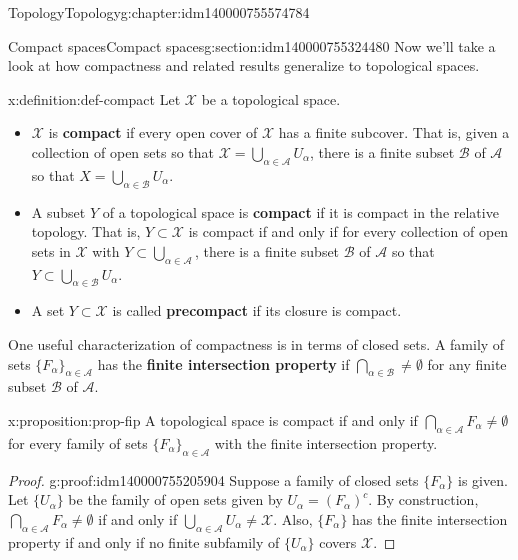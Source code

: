 \documentclass[oneside,10pt,]{book}
\newcommand{\terminology}[1]{\textbf{#1}}
\numberwithin{equation}{section}
\newcommand{\A}{\mathcal{A}}
\newcommand{\X}{\mathcal{X}}
\numberwithin{equation}{section}
\begin{document}
\begin{chapterptx}{Topology}{}{Topology}{}{}{g:chapter:idm140000755574784}
%
%
\typeout{************************************************}
\typeout{************************************************}
%
\begin{sectionptx}{Compact spaces}{}{Compact spaces}{}{}{g:section:idm140000755324480}
Now we'll take a look at how compactness and related results generalize to topological spaces.%
\begin{definition}{}{x:definition:def-compact}%
Let \(\X\) be a topological space.%
\begin{itemize}[label=\textbullet]
\item{}\(\X\) is \terminology{compact} if every open cover of \(\X\) has a finite subcover. That is, given a collection of open sets so that \(\X = \bigcup_{\alpha \in \mathcal A} U_\alpha\), there is a finite subset \(\mathcal B\) of \(\mathcal A\) so that \(X = \bigcup_{\alpha \in \mathcal B} U_\alpha\).%
\item{}A subset \(Y\) of a topological space is \terminology{compact} if it is compact in the relative topology. That is, \(Y \subset \X\) is compact if and only if for every collection of open sets in \(\X\) with \(Y \subset \bigcup_{\alpha \in \mathcal A}\), there is a finite subset \(\mathcal B\) of \(\mathcal A\) so that \(Y \subset \bigcup_{\alpha \in \mathcal B} U_\alpha\).%
\item{}A set \(Y \subset \X\) is called \terminology{precompact} if its closure is compact.%
\end{itemize}
%
\end{definition}
One useful characterization of compactness is in terms of closed sets. A family of sets \(\{F_\alpha\}_{\alpha \in \mathcal A}\) has the \terminology{finite intersection property} if \(\bigcap_{\alpha \in \mathcal B} \neq \emptyset\) for any finite subset \(\mathcal B\) of \(\mathcal A\).%
\begin{proposition}{}{}{x:proposition:prop-fip}%
A topological space is compact if and only if \(\bigcap_{\alpha \in \A} F_\alpha \neq \emptyset\) for every family of sets \(\{F_\alpha\}_{\alpha \in \A}\) with the finite intersection property.%
\end{proposition}
\begin{proof}{}{g:proof:idm140000755205904}
Suppose a family of closed sets \(\{F_\alpha\}\) is given. Let \(\{U_\alpha\}\) be the family of open sets given by \(U_\alpha = (F_\alpha)^c\). By construction, \(\bigcap_{\alpha \in \A} F_\alpha \neq \emptyset\) if and only if \(\bigcup_{\alpha \in \A} U_\alpha \neq \X\). Also, \(\{F_\alpha\}\) has the finite intersection property if and only if no finite subfamily of \(\{U_\alpha\}\) covers \(\X\).%
\end{proof}
\end{sectionptx}
\end{chapterptx}
\end{document}
